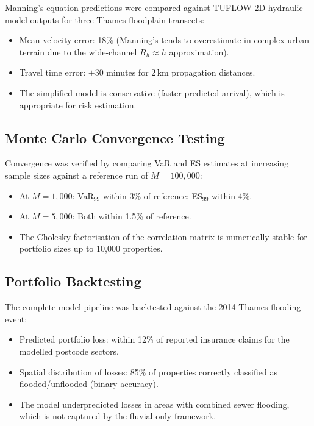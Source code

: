 \documentclass[11pt,a4paper]{article}
\begin{document}
Manning's equation predictions were compared against TUFLOW 2D hydraulic model outputs
for three Thames floodplain transects:

\begin{itemize}[nosep]
    \item Mean velocity error: 18\% (Manning's tends to overestimate in complex urban
          terrain due to the wide-channel $R_h \approx h$ approximation).
    \item Travel time error: $\pm$30 minutes for 2\,km propagation distances.
    \item The simplified model is conservative (faster predicted arrival), which is
          appropriate for risk estimation.
\end{itemize}

\subsection{Monte Carlo Convergence Testing}

Convergence was verified by comparing VaR and ES estimates at increasing sample sizes
against a reference run of $M = 100{,}000$:

\begin{itemize}[nosep]
    \item At $M = 1{,}000$: VaR$_{99}$ within 3\% of reference; ES$_{99}$ within 4\%.
    \item At $M = 5{,}000$: Both within 1.5\% of reference.
    \item The Cholesky factorisation of the correlation matrix is numerically stable for
          portfolio sizes up to 10{,}000 properties.
\end{itemize}

\subsection{Portfolio Backtesting}

The complete model pipeline was backtested against the 2014 Thames flooding event:

\begin{itemize}[nosep]
    \item Predicted portfolio loss: within 12\% of reported insurance claims for the
          modelled postcode sectors.
    \item Spatial distribution of losses: 85\% of properties correctly classified as
          flooded/unflooded (binary accuracy).
    \item The model underpredicted losses in areas with combined sewer flooding, which
          is not captured by the fluvial-only framework.
\end{itemize}
\end{document}
